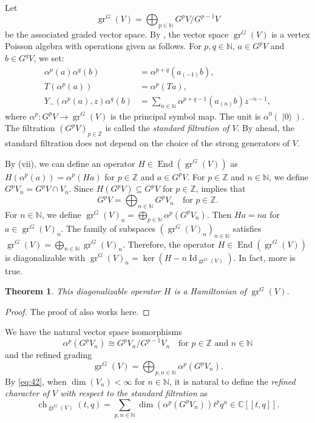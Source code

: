 \documentclass[a4paper, 12pt, reqno]{amsart}
\newtheorem{theorem}{Theorem}[section]
\theoremstyle{remark}
\DeclareMathOperator{\Id}{Id}
\DeclareMathOperator{\gr}{gr}
\DeclareMathOperator{\End}{End}
\DeclareMathOperator{\ch}{ch}
\DeclareMathOperator{\vac}{|0\rangle}
\begin{document}
Let
\begin{equation*}
  \gr^G(V) = \bigoplus_{p \in \mathbb{N}}G^pV/G^{p - 1}V
\end{equation*}
be the associated graded vector space.
By \cite{li_vertex_2004}, the vector space $\gr^G(V)$ is a vertex Poisson algebra with operations given as follows.
For $p, q \in \mathbb{N}$, $a \in G^pV$ and $b \in G^qV$, we set:
\begin{align*}
  \alpha^p(a)\alpha^q(b) &= \alpha^{p + q}(a_{(-1)}b), \\
  T(\alpha^p(a)) &= \alpha^p(Ta), \\
  Y_-(\alpha^p(a), z)\alpha^q(b) &= \sum_{n \in \mathbb{N}}\alpha^{p + q - 1}(a_{(n)}b)z^{-n - 1},
\end{align*}
where $\alpha^p: G^pV \to \gr^G(V)$ is the principal symbol map.
The unit is $\alpha^0(\vac)$.
The filtration $(G^pV)_{p \in \mathbb{Z}}$ is called the \emph{standard filtration of $V$}.
By  ahead, the standard filtration does not depend on the choice of the strong generators of $V$.

By (vii), we can define an operator $H \in \End(\gr^G(V))$ as $H(\alpha^p(a)) = \alpha^p(Ha)$ for $p \in \mathbb{Z}$ and $a \in G^pV$.
For $p \in \mathbb{Z}$ and $n \in \mathbb{N}$, we define $G^pV_n = G^pV \cap V_n$.
Since $H(G^pV) \subseteq G^pV$ for $p \in \mathbb{Z}$,  implies that
\begin{equation*}
  G^pV = \bigoplus_{n \in \mathbb{N}}G^pV_n \quad \text{for $p \in \mathbb{Z}$}.
\end{equation*}
For $n \in \mathbb{N}$, we define $\gr^G(V)_n = \bigoplus_{p \in \mathbb{N}}\alpha^p(G^pV_n)$.
Then $Ha = na$ for $a \in \gr^G(V)_n$.
The family of subspaces $(\gr^G(V)_n)_{n \in \mathbb{N}}$ satisfies $\gr^G(V) = \bigoplus_{n \in \mathbb{N}}\gr^G(V)_n$.
Therefore, the operator $H \in \End(\gr^G(V))$ is diagonalizable with $\gr^G(V)_n = \ker(H - n\Id_{\gr^G(V)})$.
In fact, more is true.

\begin{theorem}
  \label{thr:48}
  This diagonalizable operator $H$ is a Hamiltonian of $\gr^G(V)$.
\end{theorem}

\begin{proof}
  The proof of  also works here.
\end{proof}

We have the natural vector space isomorphisms
\begin{equation*}
  \alpha^p(G^pV_n) \cong G^pV_n/G^{p - 1}V_n \quad \text{for $p \in \mathbb{Z}$ and $n \in \mathbb{N}$}
\end{equation*}
and the refined grading
\begin{equation}
  \label{eq:42}
  \gr^G(V) = \bigoplus_{p, n \in \mathbb{N}}\alpha^p(G^pV_n).
\end{equation}
By \eqref{eq:42}, when $\dim(V_n) < \infty$ for $n \in \mathbb{N}$, it is natural to define the \emph{refined character of $V$ with respect to the standard filtration} as
\begin{equation*}
  \ch_{\gr^G(V)}(t, q) = \sum_{p, n \in \mathbb{N}}\dim(\alpha^p(G^pV_n))t^pq^n \in \mathbb{C}[[t, q]].
\end{equation*}
\end{document}
